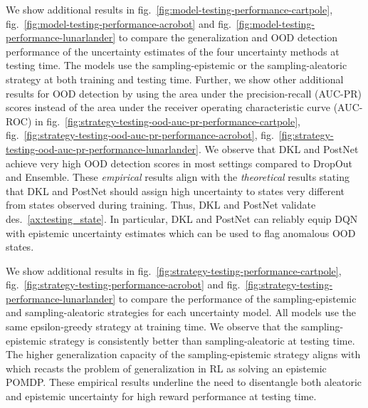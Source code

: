 We show additional results in fig.~\ref{fig:model-testing-performance-cartpole}, fig.~\ref{fig:model-testing-performance-acrobot} and fig.~\ref{fig:model-testing-performance-lunarlander} to compare the generalization and OOD detection performance of the uncertainty estimates of the four uncertainty methods at testing time. The models use the sampling-epistemic or the sampling-aleatoric strategy at both training and testing time. Further, we show other additional results for OOD detection by using the area under the precision-recall (AUC-PR) scores instead of the area under the receiver operating characteristic curve (AUC-ROC) in fig.~\ref{fig:strategy-testing-ood-auc-pr-performance-cartpole}, fig.~\ref{fig:strategy-testing-ood-auc-pr-performance-acrobot}, fig.~\ref{fig:strategy-testing-ood-auc-pr-performance-lunarlander}. We observe that DKL and PostNet achieve  very high OOD detection scores in most settings  compared to DropOut and Ensemble. These \emph{empirical} results align with the \emph{theoretical} results stating that DKL and PostNet should assign high uncertainty to states very different from states observed during training. Thus, DKL and PostNet validate des.~\ref{ax:testing_state}. In particular, DKL and PostNet can reliably equip DQN with epistemic uncertainty estimates which can be used to flag anomalous OOD states.





We show additional results in fig.~\ref{fig:strategy-testing-performance-cartpole}, fig.~\ref{fig:strategy-testing-performance-acrobot} and fig.~\ref{fig:strategy-testing-performance-lunarlander} to compare the performance of the sampling-epistemic and sampling-aleatoric strategies for each uncertainty model. All models use the same epsilon-greedy strategy at training time. We observe that the sampling-epistemic strategy is consistently better than sampling-aleatoric at testing time. The higher generalization capacity of the sampling-epistemic strategy aligns with \cite{epistemic-pomdp} which recasts the problem of generalization in RL as solving an epistemic POMDP. These empirical results underline the need to disentangle both aleatoric and epistemic uncertainty for high reward performance at testing time.



%

